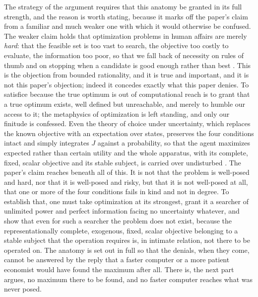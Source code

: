 The strategy of the argument requires that this anatomy be granted in its full strength, and the reason is worth stating, because it marks off the paper's claim from a familiar and much weaker one with which it would otherwise be confused. The weaker claim holds that optimization problems in human affairs are merely \emph{hard}: that the feasible set is too vast to search, the objective too costly to evaluate, the information too poor, so that we fall back of necessity on rules of thumb and on stopping when a candidate is good enough rather than best \parencite{simon1955behavioral}. This is the objection from bounded rationality, and it is true and important, and it is not this paper's objection; indeed it concedes exactly what this paper denies. To satisfice because the true optimum is out of computational reach is to grant that a true optimum exists, well defined but unreachable, and merely to humble our access to it; the metaphysics of optimization is left standing, and only our finitude is confessed. Even the theory of choice under uncertainty, which replaces the known objective with an expectation over states, preserves the four conditions intact and simply integrates $J$ against a probability, so that the agent maximizes expected rather than certain utility and the whole apparatus, with its complete, fixed, scalar objective and its stable subject, is carried over undisturbed \parencite{savage1954foundations}. The paper's claim reaches beneath all of this. It is not that the problem is well-posed and hard, nor that it is well-posed and risky, but that it is not well-posed at all, that one or more of the four conditions fails in kind and not in degree. To establish that, one must take optimization at its strongest, grant it a searcher of unlimited power and perfect information facing no uncertainty whatever, and show that even for such a searcher the problem does not exist, because the representationally complete, exogenous, fixed, scalar objective belonging to a stable subject that the operation requires is, in intimate relation, not there to be operated on. The anatomy is set out in full so that the denials, when they come, cannot be answered by the reply that a faster computer or a more patient economist would have found the maximum after all. There is, the next part argues, no maximum there to be found, and no faster computer reaches what was never posed.
